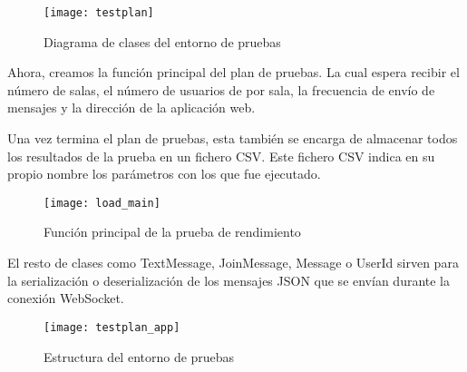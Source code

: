 \begin{figure}[htp!]
  \centering
  \texttt{[image: testplan]}
  \caption{Diagrama de clases del entorno de pruebas}
  \label{fig:testplan}
\end{figure}

Ahora, creamos la función principal del plan de pruebas. La cual espera recibir el número de salas, el número de usuarios de por sala, la frecuencia de envío de mensajes y la dirección de la aplicación web.

Una vez termina el plan de pruebas, esta también se encarga de almacenar todos los resultados de la prueba en un fichero CSV. Este fichero CSV indica en su propio nombre los parámetros con los que fue ejecutado.

\begin{figure}[htp!]
  \centering
  \texttt{[image: load\_main]}
  \caption{Función principal de la prueba de rendimiento}
  \label{fig:load_main}
\end{figure}

El resto de clases como TextMessage, JoinMessage, Message o UserId sirven para la serialización o deserialización de los mensajes JSON que se envían durante la conexión WebSocket.

\begin{figure}[htp!]
  \centering
  \texttt{[image: testplan\_app]}
  \caption{Estructura del entorno de pruebas}
  \label{fig:testplan_app}
\end{figure}
